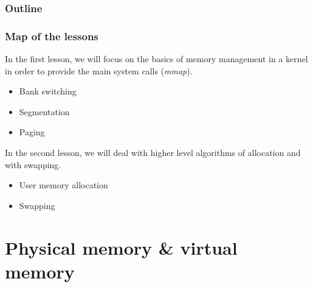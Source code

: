 %
%



%
%

\begin{frame}
  \titlepage

  \begin{center}
    \logos
  \end{center}
\end{frame}

%
%

\begin{frame}
  \frametitle{Outline}
  \tableofcontents
\end{frame}


\begin{frame}
  \frametitle{Map of the lessons}

  In the first lesson, we will focus on the basics of memory
  management in a kernel in order to provide the main system calls
  (\emph{mmap}).

  \begin{itemize}
  \item
    Bank switching
  \item
    Segmentation
  \item
    Paging
  \end{itemize}

  \-

  In the second lesson, we will deal with higher level algorithms of
  allocation and with swapping.

  \begin{itemize}
  \item
    User memory allocation
  \item
    Swapping
  \end{itemize}

\end{frame}

%
%

\section{Physical memory \& virtual memory}


